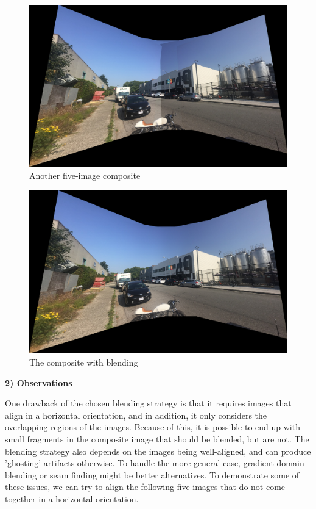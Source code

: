 \documentclass[]{article}
\begin{document}
\begin{figure}[!h]
	\includegraphics[scale=0.18]{results/p6_noblend/16}
	\centering
	\caption{Another five-image composite}
\end{figure}

\vspace{100mm}

\begin{figure}[h]
	\includegraphics[scale=0.18]{results/p6_blend/16}
	\centering
	\caption{The composite with blending}
\end{figure}

\vspace{30mm}

\vspace{5mm}
\textbf{2) Observations}
\vspace{3mm}

One drawback of the chosen blending strategy is that it requires images that align in a horizontal orientation, and in addition, it only considers the overlapping regions of the images. Because of this, it is possible to end up with small fragments in the composite image that should be blended, but are not. The blending strategy also depends on the images being well-aligned, and can produce 'ghosting' artifacts otherwise. To handle the more general case, gradient domain blending or seam finding might be better alternatives. To demonstrate some of these issues, we can try to align the following five images that do not come together in a horizontal orientation.
\end{document}
